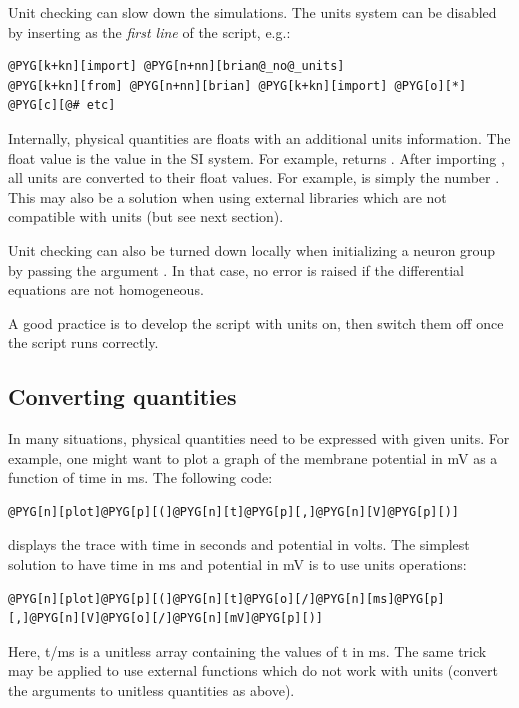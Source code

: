 \documentclass[letterpaper,10pt,english]{manual}
\begin{document}
Unit checking can slow down the simulations. The units system can be disabled by inserting
 as the \emph{first line} of the script, e.g.:

\begin{Verbatim}[commandchars=@\[\]]
@PYG[k+kn][import] @PYG[n+nn][brian@_no@_units]
@PYG[k+kn][from] @PYG[n+nn][brian] @PYG[k+kn][import] @PYG[o][*]
@PYG[c][@# etc]
\end{Verbatim}

Internally, physical quantities are floats with an additional units information. The float
value is the value in the SI system. For example,  returns .
After importing , all units are converted to their float values. For example,
 is simply the number .
This may also be a solution when using external libraries which are not compatible with units
(but see next section).

Unit checking can also be turned down locally when initializing a neuron group by
passing the argument . In that case, no error is raised if the
differential equations are not homogeneous.

A good practice is to develop the script with units on, then switch them off once the script
runs correctly.


\subsection{Converting quantities}

In many situations, physical quantities need to be expressed with given units. For example,
one might want to plot a graph of the membrane potential in mV as a function of time in ms.
The following code:

\begin{Verbatim}[commandchars=@\[\]]
@PYG[n][plot]@PYG[p][(]@PYG[n][t]@PYG[p][,]@PYG[n][V]@PYG[p][)]
\end{Verbatim}

displays the trace with time in seconds and potential in volts. The simplest solution to have
time in ms and potential in mV is to use units operations:

\begin{Verbatim}[commandchars=@\[\]]
@PYG[n][plot]@PYG[p][(]@PYG[n][t]@PYG[o][/]@PYG[n][ms]@PYG[p][,]@PYG[n][V]@PYG[o][/]@PYG[n][mV]@PYG[p][)]
\end{Verbatim}

Here, t/ms is a unitless array containing the values of t in ms.
The same trick may be applied to use external functions which do not work with units
(convert the arguments to unitless quantities as above).
\end{document}
